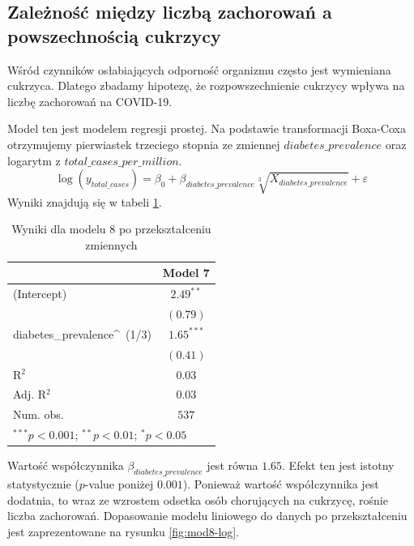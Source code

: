\documentclass[12pt]{mwbk}
\theoremstyle{plain}
\theoremstyle{definition}
\theoremstyle{definition}
\begin{document}
\subsection{Zależność między liczbą zachorowań a powszechnością cukrzycy}

Wśród czynników osłabiających odporność organizmu często jest wymieniana cukrzyca. Dlatego zbadamy hipotezę, że rozpowszechnienie cukrzycy wpływa na liczbę zachorowań na COVID-19.

Model ten jest modelem regresji prostej. Na podstawie transformacji Boxa-Coxa otrzymujemy pierwiastek trzeciego stopnia ze zmiennej $diabetes\_prevalence$ oraz logarytm z $total\_cases\_per\_million$.
$$\log(y_{total\_cases})=\beta_0+\beta_{diabetes\_prevalence}\sqrt[3]{X_{diabetes\_prevalence}}+\varepsilon$$
Wyniki znajdują się w tabeli \ref{table:mod8-log}.

\begin{table}[htbp]
	\begin{center}
		\begin{tabular}{l c}
			\hline
			& Model 7 \\
			\hline
			(Intercept)                & $2.49^{**}$  \\
			& $(0.79)$     \\
			diabetes\_prevalence\^~(1/3) & $1.65^{***}$ \\
			& $(0.41)$     \\
			\hline
			R$^2$                      & $0.03$       \\
			Adj. R$^2$                 & $0.03$       \\
			Num. obs.                  & $537$        \\
			\hline
			\multicolumn{2}{l}{\scriptsize{$^{***}p<0.001$; $^{**}p<0.01$; $^{*}p<0.05$}}
		\end{tabular}
		\caption{Wyniki dla modelu 8 po przekształceniu zmiennych}
		\label{table:mod8-log}
	\end{center}
\end{table}

Wartość współczynnika $\beta_{diabetes\_prevalence}$ jest równa $1.65$. Efekt ten jest istotny statystycznie ($p$-value poniżej $0.001$). Ponieważ wartość współczynnika jest dodatnia, to wraz ze wzrostem odsetka osób chorujących na cukrzycę, rośnie liczba zachorowań. Dopasowanie modelu liniowego do danych po przekształceniu jest zaprezentowane na rysunku \ref{fig:mod8-log}.

\newpage
\end{document}
